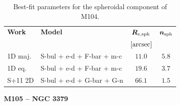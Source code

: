 \documentclass[preprint2]{emulateapj}
\begin{document}
  \begin{table}[h]
  \small
  \caption{Best-fit parameters for the spheroidal component of M104.}
  \begin{center}
  \begin{tabular}{llcc}
  \hline
  {\bf Work} & {\bf Model}   & $\bm R_{\rm e,sph}$    & $\bm n_{\rm sph}$ \\
    &  &  $[\rm arcsec]$ & \\
  \hline
  1D maj. & S-bul + e-d + F-bar + m-c  & $11.0$  &  $5.8$ \\
  1D eq.  & S-bul + e-d + F-bar + m-c  & $19.6$  &  $3.7$ \\
  \hline
  S+11 2D         & S-bul + e-d + G-bar + G-n  & $66.1$  &  $1.5$ \\
  \hline
  \end{tabular}
  \end{center}
  \label{tab:m104}
  \end{table}


  \clearpage\newpage\noindent
  {\bf M105 -- NGC 3379 \\}
\end{document}
